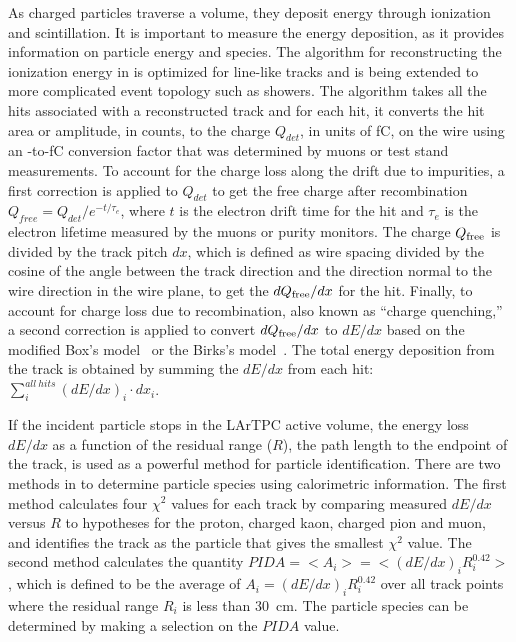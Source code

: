 As charged particles traverse a \lar{} volume, they deposit energy through ionization and scintillation. It is important to measure the energy deposition, as it provides information on particle energy and species. The algorithm for reconstructing the ionization energy in  is optimized for line-like tracks and is being extended to more complicated event topology such as showers. The algorithm takes all the hits associated with a reconstructed track and for %
each hit, it converts the hit area or amplitude, in  counts, %
to the charge $Q_{det}$, in units of \si{\femto\coulomb}, on the wire using an -to-\si{\femto\coulomb} conversion factor that was determined by muons or test stand measurements. To account for the charge loss along the drift due to impurities, a first correction is applied to $Q_{det}$ to get the free charge after recombination $Q_{free} = Q_{det}/e^{-t/\tau_{e}}$, where $t$ is the electron drift time for the hit and $\tau_{e}$ is the electron lifetime measured by the muons or purity monitors. The charge $Q_{\rm{free}}$ is divided by the track pitch $dx$, which is defined as wire spacing divided by the cosine of the angle between the track direction and the direction normal to the wire direction in the wire plane, to get the $dQ_{\rm{free}}/dx$ for the hit. Finally, to account for charge loss due to recombination, also known as ``charge quenching,'' a second correction is applied to convert $dQ_{\rm{free}}/dx$ to $dE/dx$ based on the modified Box's model~ \cite{Acciarri:2013met} or the Birks's model~\cite{Amoruso:2004dy}. The total energy deposition from the track is obtained by summing the $dE/dx$ from each hit: $\sum\limits_{i}^{all\ hits}(dE/dx)_{i}\cdot dx_{i}$.

If the incident particle stops in the LArTPC active volume, the energy loss $dE/dx$ as a function of the residual range ($R$), the path length to the endpoint of the track, is used as a powerful method for particle identification. There are two methods in  to determine particle species using calorimetric information. The first method calculates four $\chi^{2}$ values for each track by comparing measured $dE/dx$ %
versus $R$ to hypotheses for the proton, charged kaon, charged pion and muon, and identifies the track as the particle that gives the smallest $\chi^{2}$ value. The second method calculates the quantity $PIDA = <A_{i}> = <(dE/dx)_{i}R_{i}^{0.42}>$ \cite{Acciarri:2013met}, which is defined to be the average of $A_{i} = (dE/dx)_{i}R_{i}^{0.42}$ over all track points where the residual range $R_{i}$ is less than \SI{30}{cm}. The particle species can be determined by making a selection on the $PIDA$ value. 

